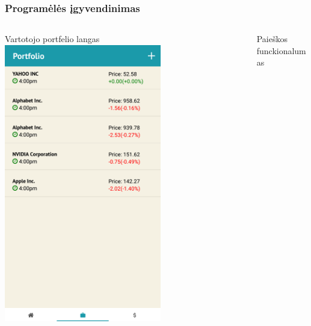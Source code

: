\documentclass[hyperref={breaklinks=true},fleqn,mathserif]{beamer}
\begin{document}
	\begin{frame}
		\frametitle{Programėlės įgyvendinimas}
		\begin{columns}
			\begin{column}{.48\textwidth}
				\begin{block}{Vartotojo portfelio langas}
					\includegraphics[width=0.65\textwidth]{Pav/portfolio.png}\centering
				\end{block}
			\end{column}
			\begin{column}{.48\textwidth}
				\begin{block}{Paieškos funckionalumas}

\end{block}
\end{column}
\end{columns}
\end{frame}
\end{document}
